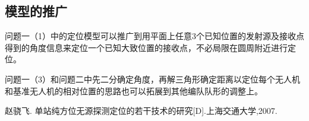 \documentclass{ctexart}
\begin{document}
\subsection{模型的推广}
    问题一（1）中的定位模型可以推广到用平面上任意3个已知位置的发射源及接收点得到的角度信息来定位一个已知大致位置的接收点，不必局限在圆周附近进行定位。

    问题一（3）和问题二中先二分确定角度，再解三角形确定距离以定位每个无人机和基准无人机的相对位置的思路也可以拓展到其他编队队形的调整上。

    

\begin{thebibliography}{100}%
   赵骁飞. 单站纯方位无源探测定位的若干技术的研究[D].上海交通大学,2007.
\end{thebibliography}







  
\end{document}
